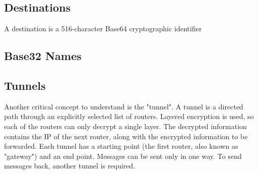 \documentclass[a4paper,twocolumn,12pt]{article}
\begin{document}
\subsection{Destinations}

A destination is a 516-character Base64 cryptographic identifier

\subsection{Base32 Names}

\subsection{Tunnels}

Another critical concept to understand is the "tunnel". A tunnel is a directed path through an explicitly selected list of routers. Layered encryption is used, so each of the routers can only decrypt a single layer. The decrypted information contains the IP of the next router, along with the encrypted information to be forwarded. Each tunnel has a starting point (the first router, also known as "gateway") and an end point. Messages can be sent only in one way. To send messages back, another tunnel is required.
\end{document}
